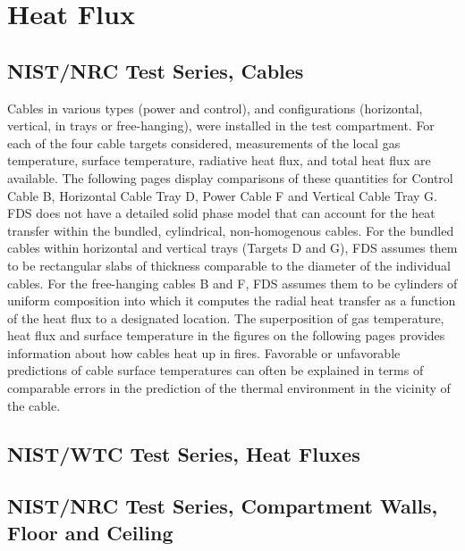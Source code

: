 \chapter{Heat Flux}




\section{NIST/NRC Test Series, Cables}

Cables in various types (power and control), and configurations (horizontal, vertical, in trays or free-hanging), were installed in
the test compartment.
For each of the four cable targets considered, measurements of the local gas temperature, surface temperature, radiative heat flux,
and total heat flux are available.  The following pages display comparisons of these quantities for
Control Cable B, Horizontal Cable Tray D, Power Cable F and Vertical Cable Tray G.
FDS does not have a detailed solid phase model that can account for the heat transfer within the bundled,
cylindrical, non-homogenous cables.  For the bundled cables within horizontal and vertical trays (Targets D and G),
FDS assumes them to be rectangular slabs of thickness comparable to the diameter of the individual cables.
For the free-hanging cables B and F, FDS assumes them to be cylinders of uniform composition into which it
computes the radial heat transfer as a function of the heat flux to a designated location.
The superposition of gas temperature, heat flux and surface temperature in the figures on the following pages
provides information about how cables heat up in fires.  Favorable or unfavorable predictions of cable surface
temperatures can often be explained in terms of comparable errors in the prediction of the thermal environment in the vicinity of the cable.




\section{NIST/WTC Test Series, Heat Fluxes}








\section{NIST/NRC Test Series, Compartment Walls, Floor and Ceiling}

